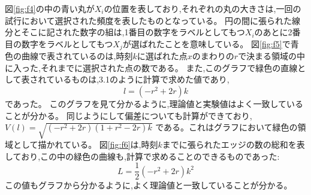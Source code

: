 図\ref{fig:f4}の中の青い丸が$X_{i}$の位置を表しており,それぞれの丸の大きさは,一回の試行において選択された頻度を表したものとなっている。
円の間に張られた線分とそこに記された数字の組は,1番目の数字をラベルとしてもつ$X_{i}$のあとに2番目の数字をラベルとしてもつ$X_{j}$が選ばれたことを意味している。
図\ref{fig:f5}で青色の曲線で表されているのは,時刻$k$に選ばれた点$x$のまわりの$r$で決まる領域の中に入った,それまでに選択された点の数である。
また,このグラフで緑色の直線として表されているものは,3.1のように計算で求めた値であり,
\[l = (-r^{2} + 2r)k\]
であった。
このグラフを見て分かるように,理論値と実験値はよく一致していることが分かる。
同じようにして偏差についても計算ができており,
$V(l) = \sqrt{(-r^{2} + 2r)(1+r^{2}-2r)k}$
である。これはグラフにおいて緑色の領域として描かれている。
図\ref{fig:f6}は,時刻$k$までに張られたエッジの数の総和を表しており,この中の緑色の曲線も,計算で求めることのできるものであった:
\[L = \frac{1}{2}(-r^{2} + 2r)k^{2}\]
この値もグラフから分かるように,よく理論値と一致していることが分かる。

